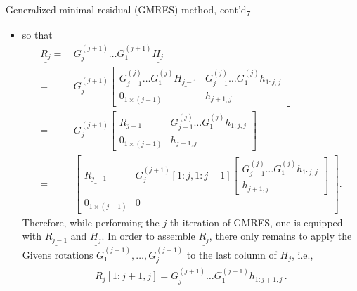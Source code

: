 \documentclass[t,usepdftitle=false]{beamer}
\begin{document}
\begin{frame}{Generalized minimal residual (GMRES) method, cont'd\textsubscript{7}}
\begin{itemize}
\item[]so that\vspace{-.15cm}
\begin{align*}
\underline{R_j}
=&\,G_j^{(j+1)}\dots G_1^{(j+1)}\underline{H_j}\\
=&\,G_j^{(j+1)}\begin{bmatrix}
G_{j-1}^{(j)}\dots G_1^{(j)}\underline{H_{j-1}}&G_{j-1}^{(j)}\dots G_1^{(j)}h_{1:j,j}\\
0_{1\times(j-1)}&h_{j+1,j}
\end{bmatrix}\\
=&\,G_j^{(j+1)}\begin{bmatrix}
\underline{R_{j-1}}&G_{j-1}^{(j)}\dots G_1^{(j)}h_{1:j,j}\\
0_{1\times(j-1)}&h_{j+1,j}
\end{bmatrix}\\
=&\,\begin{bmatrix}
\underline{R_{j-1}}&G_j^{(j+1)}[1:j,1:j+1]\begin{bmatrix}G_{j-1}^{(j)}\dots G_1^{(j)}h_{1:j,j}\\h_{j+1,j}\end{bmatrix}\\
0_{1\times(j-1)}&0
\end{bmatrix}.
\end{align*}
Therefore, while performing the $j$-th iteration of GMRES, one is equipped with $\underline{R_{j-1}}$ and $\underline{H_j}$.
In order to assemble $\underline{R_j}$, there only remains to apply the Givens rotations $G_1^{(j+1)},\dots,G_j^{(j+1)}$ to the last column of $\underline{H_j}$, i.e.,\vspace{-.15cm}
\begin{align*}
\boxed{\underline{R_j}[1:j+1,j]=G_j^{(j+1)}\dots G_1^{(j+1)}h_{1:j+1,j}}\,.
\end{align*}
\end{itemize}
\end{frame}
\end{document}

